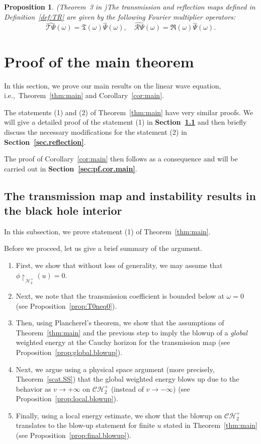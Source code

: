 \documentclass[10pt, reqno]{amsart}
\newtheorem{proposition}[theorem]{Proposition}
\theoremstyle{definition}
\theoremstyle{remark}
\numberwithin{equation}{section}
\newcommand{\0}{\emptyset}
\newcommand{\om}{\omega}
\newcommand{\calC}{\mathcal C}
\newcommand{\calH}{\mathcal H}
\newcommand{\CH}{\calC \calH^{+}}		%
\begin{document}
\begin{proposition}(Theorem~3 in \cite{KSR})\label{prop:T.R.phase.rep.2}
The transmission and reflection maps defined in Definition~\ref{def:TR} are given by the following Fourier multiplier operators:
$$\widehat{\mathcal T \Psi}(\om) = \mathfrak T(\om) \widehat{\Psi}(\om),\quad \widehat{\mathcal R \Psi}(\om) = \mathfrak R(\om) \widehat{\Psi}(\om). $$
\end{proposition}




\section{Proof of the main theorem}\label{sec:proof}
In this section, we prove our main results on the linear wave equation, i.e.,~Theorem~\ref{thm:main} and Corollary~\ref{cor:main}. 

The statements (1) and (2) of Theorem~\ref{thm:main} have very similar proofs. We will give a detailed proof of the statement (1) in \textbf{Section~\ref{sec.transmission}} and then briefly discuss the necessary modifications for the statement (2) in \textbf{Section~\ref{sec.reflection}}.

The proof of Corollary~\ref{cor:main} then follows as a consequence and will be carried out in \textbf{Section~\ref{sec:pf.cor.main}}.


\subsection{The transmission map and instability results in the black hole interior}\label{sec.transmission}
In this subsection, we prove statement (1) of Theorem~\ref{thm:main}. 


Before we proceed, let us give a brief summary of the argument.
\begin{enumerate}
\item First, we show that without loss of generality, we may assume that $\phi\restriction_{\mathcal{H}^+_2}(u) = 0$.
\item Next, we note that the transmission coefficient is bounded below at $\om=0$ (see Proposition~\ref{prop:T0neq0}).
\item Then, using Plancherel's theorem, we show that the assumptions of Theorem~\ref{thm:main} and the previous step to imply the blowup of a \emph{global} weighted energy at the Cauchy horizon for the transmission map (see Proposition~\ref{prop:global.blowup}).
\item Next, we argue using a physical space argument (more precisely, Theorem~\ref{scat.SS}) that the global weighted energy blows up due to the behavior as $v\to+\infty$ on $\CH_2$ (instead of $v\to -\infty$) (see Proposition~\ref{prop:local.blowup}).
\item Finally, using a local energy estimate, we show that the blowup on $\CH_2$ translates to the blow-up statement for finite $u$ stated in Theorem~\ref{thm:main} (see Proposition~\ref{prop:final.blowup}).
\end{enumerate}
\end{document}
